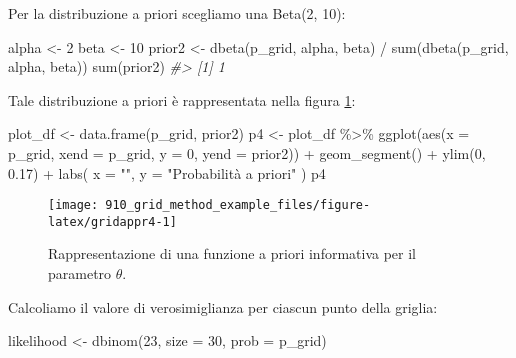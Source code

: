 \documentclass[
]{memoir}
\newenvironment{Shaded}{\begin{snugshade}}{\end{snugshade}}
\newcommand{\AttributeTok}[1]{\textcolor[rgb]{0.77,0.63,0.00}{#1}}
\newcommand{\CommentTok}[1]{\textcolor[rgb]{0.56,0.35,0.01}{\textit{#1}}}
\newcommand{\DecValTok}[1]{\textcolor[rgb]{0.00,0.00,0.81}{#1}}
\newcommand{\FloatTok}[1]{\textcolor[rgb]{0.00,0.00,0.81}{#1}}
\newcommand{\FunctionTok}[1]{\textcolor[rgb]{0.00,0.00,0.00}{#1}}
\newcommand{\NormalTok}[1]{#1}
\newcommand{\OtherTok}[1]{\textcolor[rgb]{0.56,0.35,0.01}{#1}}
\newcommand{\SpecialCharTok}[1]{\textcolor[rgb]{0.00,0.00,0.00}{#1}}
\newcommand{\StringTok}[1]{\textcolor[rgb]{0.31,0.60,0.02}{#1}}
\begin{document}
\noindent
Per la distribuzione a priori scegliamo una Beta(2, 10):

\begin{Shaded}
\begin{Highlighting}[]
\NormalTok{alpha }\OtherTok{\textless{}{-}} \DecValTok{2}
\NormalTok{beta }\OtherTok{\textless{}{-}} \DecValTok{10}
\NormalTok{prior2 }\OtherTok{\textless{}{-}} \FunctionTok{dbeta}\NormalTok{(p\_grid, alpha, beta) }\SpecialCharTok{/} \FunctionTok{sum}\NormalTok{(}\FunctionTok{dbeta}\NormalTok{(p\_grid, alpha, beta))}
\FunctionTok{sum}\NormalTok{(prior2)}
\CommentTok{\#\textgreater{} [1] 1}
\end{Highlighting}
\end{Shaded}

\noindent
Tale distribuzione a priori è rappresentata nella figura \ref{fig:gridappr4}:

\begin{Shaded}
\begin{Highlighting}[]
\NormalTok{plot\_df }\OtherTok{\textless{}{-}} \FunctionTok{data.frame}\NormalTok{(p\_grid, prior2)}
\NormalTok{p4 }\OtherTok{\textless{}{-}}\NormalTok{ plot\_df }\SpecialCharTok{\%\textgreater{}\%}
  \FunctionTok{ggplot}\NormalTok{(}\FunctionTok{aes}\NormalTok{(}\AttributeTok{x =}\NormalTok{ p\_grid, }\AttributeTok{xend =}\NormalTok{ p\_grid, }\AttributeTok{y =} \DecValTok{0}\NormalTok{, }\AttributeTok{yend =}\NormalTok{ prior2)) }\SpecialCharTok{+}
  \FunctionTok{geom\_segment}\NormalTok{() }\SpecialCharTok{+}
  \FunctionTok{ylim}\NormalTok{(}\DecValTok{0}\NormalTok{, }\FloatTok{0.17}\NormalTok{) }\SpecialCharTok{+}
  \FunctionTok{labs}\NormalTok{(}
    \AttributeTok{x =} \StringTok{""}\NormalTok{,}
    \AttributeTok{y =} \StringTok{"Probabilità a priori"}
\NormalTok{  )}
\NormalTok{p4}
\end{Highlighting}
\end{Shaded}

\begin{figure}

{\centering \texttt{[image: 910\_grid\_method\_example\_files/figure-latex/gridappr4-1]} 

}

\caption{Rappresentazione di una funzione a priori informativa per il parametro $\theta$.}\label{fig:gridappr4}
\end{figure}

\noindent
Calcoliamo il valore di verosimiglianza per ciascun punto della griglia:

\begin{Shaded}
\begin{Highlighting}[]
\NormalTok{likelihood }\OtherTok{\textless{}{-}} \FunctionTok{dbinom}\NormalTok{(}\DecValTok{23}\NormalTok{, }\AttributeTok{size =} \DecValTok{30}\NormalTok{, }\AttributeTok{prob =}\NormalTok{ p\_grid)}
\end{Highlighting}
\end{Shaded}
\end{document}
